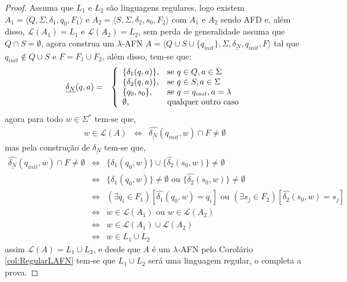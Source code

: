 \begin{proof}
	Assuma que $L_1$ e $L_2$ são linguagens regulares, logo existem $A_1 = \langle Q, \Sigma, \delta_1, q_0,  F_1\rangle$ e $A_2 = \langle S, \Sigma, \delta_2, s_0,  F_2\rangle$ com $A_1$ e $A_2$ sendo AFD e, além disso, $\mathcal{L}(A_1) = L_1$ e $\mathcal{L}(A_2) = L_2$, sem perda de generalidade assuma que $Q \cap S = \emptyset$, agora construa um $\lambda$-AFN $A = \langle Q \cup S \cup \{q_{init}\}, \Sigma, \underline{\delta_N}, q_{init}, F\rangle$ tal que $q_{init} \notin Q \cup S$ e $F = F_1 \cup F_2$, além disso, tem-se que:
	\begin{eqnarray*}
		\underline{\delta_N}(q, a) & = & \left\{\begin{array}{ll}	\{\delta_1(q, a)\}, & \hbox{se } q \in Q, a \in \Sigma \\	\{\delta_2(q, a)\},  & \hbox{se } q \in S, a \in \Sigma \\ \{q_0, s_0\}, &   \hbox{se } q = q_{init}, a = \lambda \\ \emptyset, & \hbox{qualquer outro caso} \end{array}\right.
	\end{eqnarray*}
	agora para todo $w \in \Sigma^*$ tem-se que, 
	\begin{eqnarray*}
		w \in \mathcal{L}(A) & \Longleftrightarrow & \widehat{\underline{\delta_N}}(q_{init}, w) \cap F \neq \emptyset
	\end{eqnarray*}
	mas pela construção de $\underline{\delta_N}$ tem-se que,
	\begin{eqnarray*}
		\widehat{\underline{\delta_N}}(q_{init}, w) \cap F \neq \emptyset & \Longleftrightarrow & \{\widehat{\delta_1}(q_{0}, w)\} \cup  \{\widehat{\delta_2}(s_{0}, w)\} \neq \emptyset\\
		& \Longleftrightarrow & \{\widehat{\delta_1}(q_{0}, w)\} \neq \emptyset \text{ ou } \{\widehat{\delta_2}(s_{0}, w)\} \neq \emptyset \\
		& \Longleftrightarrow & (\exists q_i \in F_1)[\widehat{\delta_1}(q_{0}, w) = q_i] \text{ ou }  (\exists s_j \in F_2)[\widehat{\delta_2}(s_{0}, w) = s_j]\\
		& \Longleftrightarrow & w \in \mathcal{L}(A_1) \text{ ou } w \in \mathcal{L}(A_2) \\
		& \Longleftrightarrow & w \in \mathcal{L}(A_1) \cup \mathcal{L}(A_2) \\
		& \Longleftrightarrow & w \in L_1 \cup L_2
	\end{eqnarray*}
	assim $\mathcal{L}(A) = L_1 \cup L_2$, e desde que $A$ é um $\lambda$-AFN pelo Corolário \ref{col:RegularLAFN} tem-se que $L_1 \cup L_2$ será uma linguagem regular, o completa a prova.
\end{proof}

